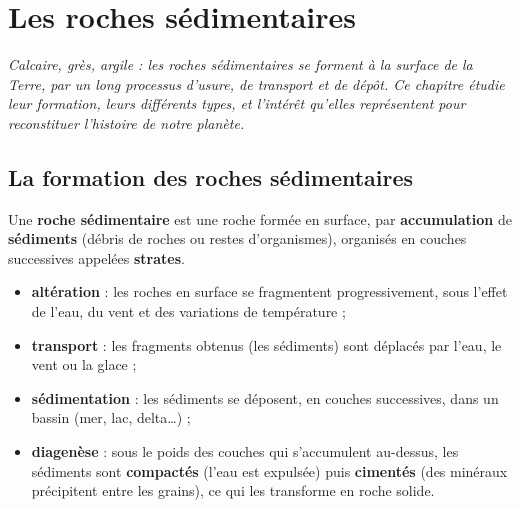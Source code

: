\chapter{Les roches sédimentaires}

\noindent\textit{Calcaire, grès, argile : les roches sédimentaires se forment à la
surface de la Terre, par un long processus d'usure, de transport et de dépôt. Ce
chapitre étudie leur formation, leurs différents types, et l'intérêt qu'elles
représentent pour reconstituer l'histoire de notre planète.}
\vspace{8pt}

\connecteBanner

\section{La formation des roches sédimentaires}

\begin{definition}
Une \textbf{roche sédimentaire} est une roche formée en surface, par
\textbf{accumulation} de \textbf{sédiments} (débris de roches ou restes
d'organismes), organisés en couches successives appelées \textbf{strates}.
\end{definition}

\begin{propriete}
\begin{itemize}
\item \textbf{altération} : les roches en surface se fragmentent progressivement,
sous l'effet de l'eau, du vent et des variations de température ;
\item \textbf{transport} : les fragments obtenus (les sédiments) sont déplacés par
l'eau, le vent ou la glace ;
\item \textbf{sédimentation} : les sédiments se déposent, en couches successives,
dans un bassin (mer, lac, delta\dots) ;
\item \textbf{diagenèse} : sous le poids des couches qui s'accumulent au-dessus,
les sédiments sont \textbf{compactés} (l'eau est expulsée) puis \textbf{cimentés}
(des minéraux précipitent entre les grains), ce qui les transforme en roche solide.
\end{itemize}
\end{propriete}

\begin{illus}
\end{illus}

